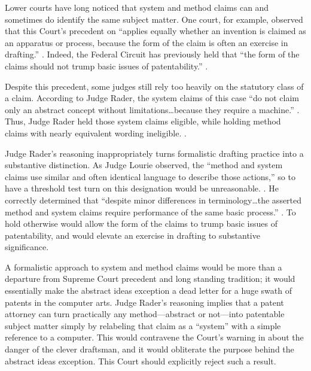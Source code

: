 \documentclass{scotus}
\begin{document}
Lower courts have long noticed that system and method claims can and sometimes
do identify the same subject matter.  One court, for example, observed
that this Court's precedent on  ``applies equally whether an
invention is claimed as an apparatus or process, because the form of the claim
is often an exercise in drafting.'' . Indeed, the Federal Circuit has previously held
that ``the form of the claims should not trump basic issues of patentability.''
.

Despite this precedent, some judges still rely too heavily on
the statutory class of a claim.  According to Judge Rader,
the system claims of this case “do not claim only an abstract concept without
limitations\ldots because they require a machine.” . Thus, Judge Rader held those system claims eligible, while holding
method claims with nearly equivalent wording ineligible. .

Judge Rader’s reasoning inappropriately turns formalistic drafting practice into
a substantive distinction.  As Judge Lourie observed, the “method and system
claims use similar and often identical language to describe those actions,” so
to have a threshold test turn on this designation would be unreasonable.
. He correctly determined that “despite minor
differences in terminology\ldots the asserted method and system claims require
performance of the same basic process.” .  To hold
otherwise would allow the form of the claims to trump basic issues of
patentability, and would elevate an exercise in drafting to substantive
significance.

A formalistic approach to system and method claims would be more than a
departure from Supreme Court precedent and long standing tradition; it would
essentially make the abstract ideas exception a dead letter for a huge swath of
patents in the computer arts. Judge Rader’s reasoning implies that a patent
attorney can turn practically any method---abstract or not---into patentable
subject matter simply by relabeling that claim as a “system” with a simple
reference to a computer.  This would contravene the Court's warning
in 
about the danger of the clever draftsman, and it would obliterate the purpose
behind the
abstract ideas exception. This Court should explicitly reject such a result.
\end{document}
